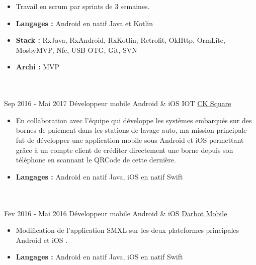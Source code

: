 \documentclass[letterpaper]{twentysecondcv} %
\begin{document}
\begin{twenty}
{\begin{itemize}
        \item Travail en scrum par sprints de 3 semaines.
        \item   \textbf{Langages : }Android en natif Java et Kotlin
        \item \textbf{Stack :} RxJava, RxAndroid, RxKotlin, Retrofit, OkHttp, OrmLite, MosbyMVP, Nfc, USB OTG, Git, SVN
        \item \textbf{Archi :} MVP
        \end{itemize}}
        \\ \\ 
	\twentyitem
    	{Sep 2016 -}
		{Mai 2017}
        {Développeur mobile Android \& iOS IOT}
        {\href{http://www.cksquare.fr/}{CK Square}}
        {}
        {
        {\begin{itemize}
        \item En collaboration avec l'équipe qui développe les systèmes embarqués sur des bornes de paiement dans les stations de lavage auto, ma mission principale fut de développer une application mobile sous Android et iOS permettant grâce à un compte client de créditer directement une borne depuis son téléphone en scannant le QRCode de cette dernière.
        \item \textbf{Langages : }Android en natif Java, iOS en natif Swift
    \end{itemize}}
        }
    \\ \\ 
    \twentyitem
   		{Fev 2016 -}
		{Mai 2016}
        {Développeur mobile Android \& iOS}
        {\href{https://www.smxlapp.com/}{Darbot Mobile}}
        {}
        {
        {\begin{itemize}
        \item Modification de l'application SMXL sur les deux plateformes principales Android et iOS .
        \item  \textbf{Langages : }Android en natif Java, iOS en natif Swift
    \end{itemize}}
        }
   
\end{twenty}
\end{document}
